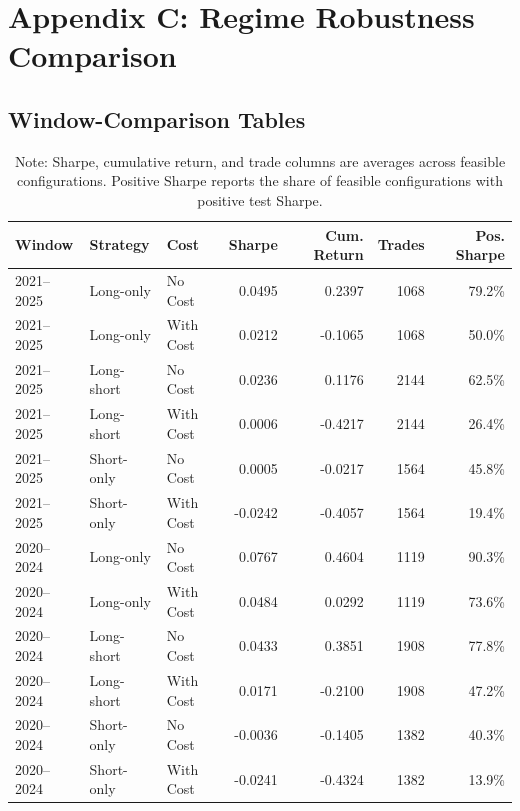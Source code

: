 \documentclass[12pt]{article}
\begin{document}
\clearpage
\section{Appendix C: Regime Robustness Comparison}
\label{app:regime}

\subsection{Window-Comparison Tables}

\begin{table}[H]
\centering
\caption{Strategy-mode comparison across the 2021--2025 and 2020--2024 windows.}
\label{tab:appendix_c_strategy_mode}
\begingroup
\small
\singlespacing
\begin{tabular}{lllrrrr}
\toprule
Window & Strategy & Cost & Sharpe & Cum. Return & Trades & Pos. Sharpe \\
\midrule
2021--2025 & Long-only & No Cost & 0.0495 & 0.2397 & 1068 & 79.2\% \\
2021--2025 & Long-only & With Cost & 0.0212 & -0.1065 & 1068 & 50.0\% \\
2021--2025 & Long-short & No Cost & 0.0236 & 0.1176 & 2144 & 62.5\% \\
2021--2025 & Long-short & With Cost & 0.0006 & -0.4217 & 2144 & 26.4\% \\
2021--2025 & Short-only & No Cost & 0.0005 & -0.0217 & 1564 & 45.8\% \\
2021--2025 & Short-only & With Cost & -0.0242 & -0.4057 & 1564 & 19.4\% \\
2020--2024 & Long-only & No Cost & 0.0767 & 0.4604 & 1119 & 90.3\% \\
2020--2024 & Long-only & With Cost & 0.0484 & 0.0292 & 1119 & 73.6\% \\
2020--2024 & Long-short & No Cost & 0.0433 & 0.3851 & 1908 & 77.8\% \\
2020--2024 & Long-short & With Cost & 0.0171 & -0.2100 & 1908 & 47.2\% \\
2020--2024 & Short-only & No Cost & -0.0036 & -0.1405 & 1382 & 40.3\% \\
2020--2024 & Short-only & With Cost & -0.0241 & -0.4324 & 1382 & 13.9\% \\
\bottomrule
\end{tabular}
\endgroup
\caption*{\footnotesize Note: Sharpe, cumulative return, and trade columns are averages across feasible configurations. Positive Sharpe reports the share of feasible configurations with positive test Sharpe.}
\end{table}
\end{document}
